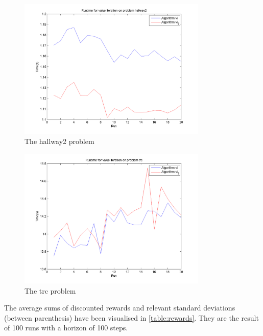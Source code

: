 \documentclass[10pt,a4paper]{article}
\begin{document}
\begin{figure}
\vspace{-20pt}
\hspace{-30pt}
\centering
\includegraphics[width=0.8\textwidth]{Timings/hallway2/timings_vi.png}
\caption{The hallway2 problem}
\hspace{-30pt}
\label{fig:vi_hallway2}
\vspace{-20pt}
\end{figure}
        
\begin{figure}
\vspace{-20pt}
\hspace{-30pt}
\centering
\includegraphics[width=0.8\textwidth]{Timings/trc/timings_vi.png}
\hspace{-30pt}
\caption{The trc problem}
\label{fig:vi_trc}
\vspace{-20pt}
\end{figure}

The average sums of discounted rewards and relevant standard deviations (between parenthesis) have been visualised in \ref{table:rewards}. They are the result of 100 runs with a horizon of 100 steps.
\end{document}
